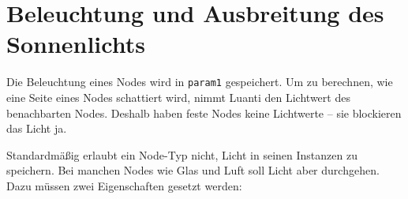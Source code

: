 \begin{Shaded}
\begin{Highlighting}[]
\OperatorTok{(}\OperatorTok{,} \OperatorTok{\{}
     \OperatorTok{=} \OperatorTok{,}
     \OperatorTok{=} \OperatorTok{,}
     \OperatorTok{=} \OperatorTok{,}
     \OperatorTok{=} \OperatorTok{,}

     \OperatorTok{=} \OperatorTok{,} 
     \OperatorTok{=} \OperatorTok{,} 
     \OperatorTok{=} \OperatorTok{,} 
     \OperatorTok{=} \OperatorTok{,} 

     \OperatorTok{=} \OperatorTok{,}
     \OperatorTok{=} \OperatorTok{,}
     \OperatorTok{=} \OperatorTok{\{}  \OperatorTok{=}  \OperatorTok{\},}
\OperatorTok{\})}
\end{Highlighting}
\end{Shaded}

\section{Beleuchtung und Ausbreitung des
Sonnenlichts}\label{beleuchtung-und-ausbreitung-des-sonnenlichts}

Die Beleuchtung eines Nodes wird in \texttt{param1} gespeichert. Um zu
berechnen, wie eine Seite eines Nodes schattiert wird, nimmt Luanti den
Lichtwert des benachbarten Nodes. Deshalb haben feste Nodes keine
Lichtwerte -- sie blockieren das Licht ja.

Standardmäßig erlaubt ein Node-Typ nicht, Licht in seinen Instanzen zu
speichern. Bei manchen Nodes wie Glas und Luft soll Licht aber
durchgehen. Dazu müssen zwei Eigenschaften gesetzt werden:

